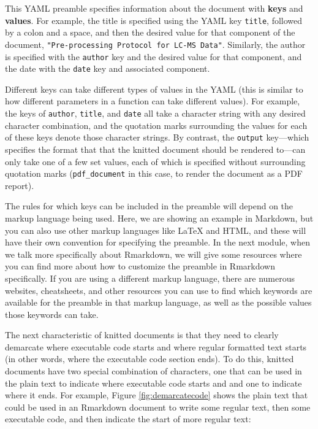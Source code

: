 \documentclass[]{tufte-book}
\begin{document}
This YAML preamble specifies information about the document with \textbf{keys} and
\textbf{values}. For example, the title is specified using the YAML key \texttt{title},
followed by a colon and a space, and then the desired value for that
component of the document, \texttt{"Pre-processing\ Protocol\ for\ LC-MS\ Data"}.
Similarly, the author is specified with the \texttt{author} key and the desired
value for that component, and the date with the \texttt{date} key and associated
component.

Different keys can take different types of values in the YAML
(this is similar to how different parameters in a function can take different values). For example, the keys of \texttt{author}, \texttt{title}, and \texttt{date} all take
a character string with any desired character combination, and the quotation
marks surrounding the values for each of these keys denote those character strings. By contrast, the \texttt{output} key---which specifies the format that
that the knitted document should be rendered to---can only take one of a
few set values, each of which is specified without surrounding
quotation marks (\texttt{pdf\_document} in this case, to render the document
as a PDF report).

The rules for which keys can be included in the preamble will depend on the
markup language being used. Here, we are showing an example in Markdown, but you
can also use other markup languages like LaTeX and HTML, and these will have
their own convention for specifying the preamble. In the next module, when we
talk more specifically about Rmarkdown, we will give some resources where you
can find more about how to customize the preamble in Rmarkdown specifically. If
you are using a different markup language, there are numerous websites,
cheatsheets, and other resources you can use to find which keywords are
available for the preamble in that markup language, as well as the possible
values those keywords can take.

The next characteristic of knitted documents is that they need to clearly
demarcate where executable code starts and where regular formatted text starts
(in other words, where the executable code section ends). To do this, knitted
documents have two special combination of characters, one that can be used in
the plain text to indicate where executable code starts and and one to indicate
where it ends. For example, Figure \ref{fig:demarcatecode} shows the plain text
that could be used in an Rmarkdown document to write some regular text, then
some executable code, and then indicate the start of more regular text:
\end{document}
